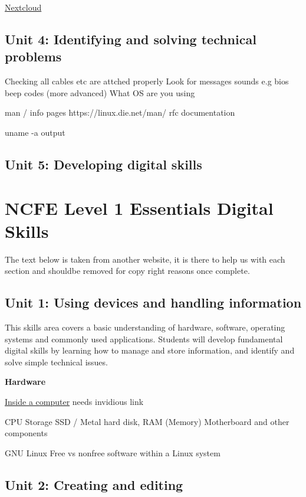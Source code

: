 \href{https://www.nextcloud.com}{Nextcloud}



\section{Unit 4: Identifying and solving technical problems}

Checking all cables etc are attched properly
Look for messages
sounds e.g bios beep codes (more advanced)
What OS are you using

man / info pages  https://linux.die.net/man/
rfc documentation

uname -a output

\section{Unit 5: Developing digital skills}





\chapter{NCFE Level 1 Essentials Digital Skills}

The text below is taken from another website, it is there to help us with each section and shouldbe removed for copy right reasons once complete.

\section{Unit 1: Using devices and handling information}

This skills area covers a basic understanding of hardware, software, operating systems and commonly used applications. Students will develop fundamental digital skills by learning how to manage and store information, and identify and solve simple technical issues.

\textbf{Hardware}

\href{https://www.youtube.com/watch?v=HB4I2CgkcCo}{Inside a computer} needs invidious link

CPU 
Storage SSD / Metal hard disk, 
RAM (Memory)
Motherboard and other components

GNU Linux
Free vs nonfree software within a Linux system

\section{Unit 2: Creating and editing}

